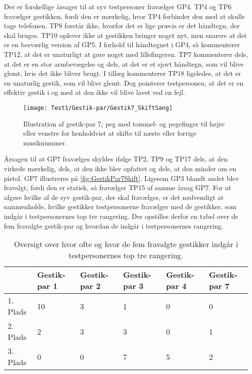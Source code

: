 \noindent
%
Der er forskellige årsager til at syv testpersoner fravælger GP4. TP4 og TP6 fravælger gestikken, fordi den er mærkelig, hvor TP4 forbinder den med at skulle tage telefonen. TP8 forstår ikke, hvorfor det er lige præcis er det håndtegn, der skal bruges. TP10 oplever ikke at gestikken bringer noget nyt, men snarere at det er en besværlig version af GP5. I forhold til håndtegnet i GP4, så kommenterer TP12, at det er unaturligt at gøre noget med lillefingeren. TP7 kommenterer dels, at det er en stor armbevægelse og dels, at det er et sjovt håndtegn, som vil blive glemt, hvis det ikke bliver brugt. I tillæg kommenterer TP18 ligeledes, at det er en unaturlig gestik, som vil blive glemt. Dog pointerer testpersonen, at det er en effektiv gestik i og med at den ikke vil blive lavet ved en fejl.
%
\begin{figure}[H]
	\centering
	\texttt{[image: Test1/Gestik-par/Gestik7\_SkiftSang]}
	\caption{Illustration af gestik-par 7; peg med tommel- og pegefinger til højre eller venstre for henholdvist at skifte til næste eller forrige musiknummer.}
	\label{fig:GestikPar7Skift}
\end{figure}
\noindent
% 
Årsagen til at GP7 fravælges skyldes ifølge TP2, TP9 og TP17 dels, at den virkede mærkelig, dels, at den ikke blev opfattet og dels, at den minder om en pistol. GP7 illustreres på \autoref{fig:GestikPar7Skift}. Ligesom GP3 blandt andet blev fravalgt, fordi den er statisk, så fravælger TP15 af samme årsag GP7.\blankline
%
For at afgøre hvilke af de syv gestik-par, der skal fravælges, er det nødvendigt at sammenholde, hvilke gestikker testpersonerne fravælger med de gestikker, som indgår i testpersonernes top tre rangering. Der opstilles derfor en tabel over de fem fravalgte gestik-par og hvordan de indgår i testpersonernes rangering.    
%
\begin{table}[H]
	\centering
	\begin{tabular}{ | p{1.5cm} | p{2.1cm} | p{2.1cm} | p{2.1cm} | p{2.1cm} | p{2.1cm} |}
	\hline
		 & Gestik-par 1 & Gestik-par 2 & Gestik-par 3 & Gestik-par 4 & Gestik-par 7 \\ \hline
		1. Plads & 10 & 3 & 1 & 0 & 0\\ \hline
		2. Plads & 2 & 3 & 3 & 0 & 1\\ \hline
		3. Plads & 0 & 0 & 7 & 5 & 2\\ \hline
	\end{tabular}
	\caption{Oversigt over hvor ofte og hvor de fem fravalgte gestikker indgår i testpersonernes top tre rangering.}
	\label{tab:FravalgteTopTreSkift}
\end{table}
